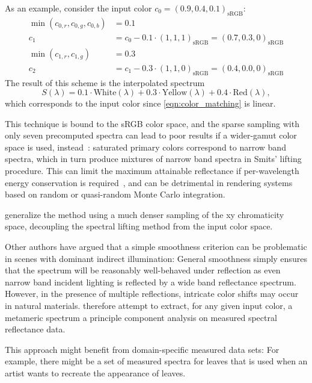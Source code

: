 As an example, consider the input color $c_0=(0.9, 0.4, 0.1)_\text{sRGB}$:
\begin{align*}
    \min(c_{0,r}, c_{0,g}, c_{0,b}) &= 0.1\\
    c_1 &= c_0 - 0.1\cdot(1,1,1)_\text{sRGB} = (0.7, 0.3, 0)_\text{sRGB}\\
    \min(c_{1,r}, c_{1,g}) &= 0.3\\
    c_2 &= c_1 - 0.3\cdot(1,1,0)_\text{sRGB} = (0.4, 0.0, 0)_\text{sRGB}
\end{align*}
The result of this scheme is the interpolated spectrum
\begin{equation}
    S(\lambda) = 0.1\cdot \text{White}(\lambda)
               + 0.3\cdot \text{Yellow}(\lambda)
               + 0.4\cdot \text{Red}(\lambda),
\end{equation}
which corresponds to the input color since \cref{eqn:color_matching} is linear.

This technique is bound to the sRGB color space, and the sparse sampling with only
seven precomputed spectra can lead to poor results if a wider-gamut color space is
used, instead~\cite{meng2015}: saturated primary colors correspond to narrow
band spectra, which in turn produce mixtures of narrow band spectra in Smits' lifting
procedure. This can limit the maximum attainable reflectance if per-wavelength energy conservation
is required~\cite{schroedinger19}, and can be detrimental in rendering systems based
on random or quasi-random Monte Carlo integration.

\textcite{meng2015} generalize the method using a much denser sampling of the xy chromaticity
space, decoupling the spectral lifting method from the input color space.

Other authors have argued that a simple smoothness criterion can be problematic
in scenes with dominant indirect illumination: 
General smoothness simply ensures that the spectrum
will be reasonably well-behaved under reflection as even narrow band incident lighting is
reflected by a wide band reflectance spectrum. However, in the presence of multiple
reflections, intricate color shifts may occur in natural materials.
\textcite{otsu2017} therefore attempt to extract, for any given input color, a metameric spectrum 
a principle component analysis on measured spectral reflectance data.

This approach might benefit from domain-specific measured data sets: For example, there might
be a set of measured spectra for leaves that is used when an artist wants to recreate the
appearance of leaves.




